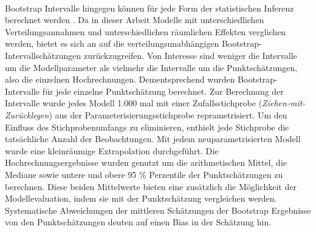 \documentclass{Vorlage}
\begin{document}
\\Bootstrap Intervalle hingegen können für jede Form der statistischen Inferenz berechnet werden \cite{diciccio1996}. Da in dieser Arbeit Modelle mit unterschiedlichen Verteilungsannahmen und unterschiedlichen räumlichen Effekten verglichen werden, bietet es sich an auf die verteilungsunabhängigen Bootstrap-Intervallschätzungen zurückzugreifen. Von Interesse sind weniger die Intervalle um die Modellparameter als vielmehr die Intervalle um die Punktschätzungen, also die einzelnen Hochrechnungen. Dementsprechend wurden Bootstrap-Intervalle für jede einzelne Punktschätzung berechnet. Zur Berechnung der Intervalle wurde jedes Modell 1.000 mal mit einer Zufallsstichprobe (\textit{Ziehen-mit-Zurücklegen}) aus der Parameterisierungsstichprobe reprametrisiert. Um den Einfluss des Stichprobenumfangs zu eliminieren, enthielt jede Stichprobe die tatsächliche Anzahl der Beobachtungen. Mit jedem neuparametrisierten Modell wurde eine kleinräumige Extrapolation durchgeführt. Die Hochrechnungsergebnisse wurden genutzt um die arithmetischen Mittel, die Mediane sowie untere und obere 95 \% Perzentile der Punktschätzungen zu berechnen. Diese beiden Mittelwerte bieten eine zusätzlich die Möglichkeit der Modellevaluation, indem sie mit der Punktschätzung vergleichen werden. Systematische Abweichungen der mittleren Schätzungen der Bootstrap Ergebnisse von den Punktschätzungen deuten auf einen Bias in der Schätzung hin.
\end{document}
